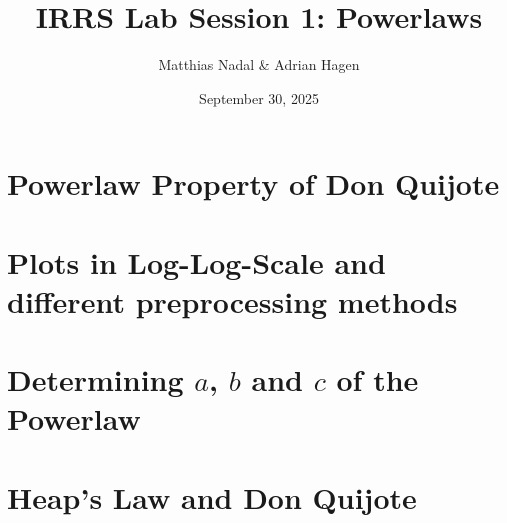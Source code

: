 \documentclass[a4paper,oneside,bibliography=totoc]{scrartcl}
\begin{document}
\subject{Lab Report} %
\title{IRRS Lab Session 1: Powerlaws}
\author{Matthias Nadal \& Adrian Hagen}
\date{September 30, 2025}
\maketitle

\section{Powerlaw Property of Don Quijote}

\section{Plots in Log-Log-Scale and different preprocessing methods}

\section{Determining $a$, $b$ and $c$ of the Powerlaw}

\section{Heap's Law and Don Quijote}
\end{document}
